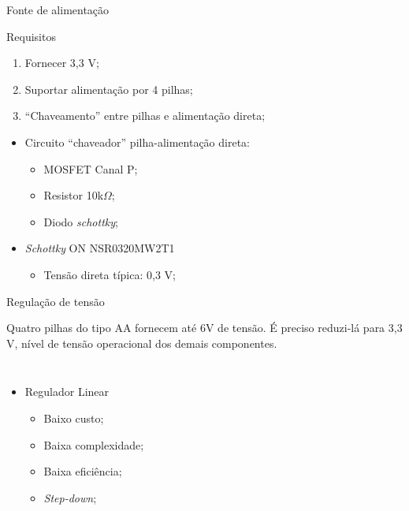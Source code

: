 \begin{frame}[allowframebreaks]{Fonte de alimentação}

\begin{block}{Requisitos}
    \begin{enumerate}
        \item Fornecer 3,3 V;
        \item Suportar alimentação por 4 pilhas;
        \item ``Chaveamento'' entre pilhas e alimentação direta;
    \end{enumerate}
\end{block}


\framebreak

\begin{itemize}
    \item Circuito ``chaveador'' pilha-alimentação direta:
        \begin{itemize}
            \item MOSFET Canal P;
            \item Resistor 10k$\Omega$;
            \item Diodo \textit{schottky};
        \end{itemize}
        \item \textit{Schottky} ON NSR0320MW2T1
        \begin{itemize}
            \item Tensão direta típica: 0,3 V;
        \end{itemize}
        
\end{itemize}



\framebreak
    
    
\begin{block}{Regulação de tensão}

Quatro pilhas do tipo AA fornecem até 6V de tensão. É preciso reduzi-lá para 3,3 V, nível de tensão operacional dos demais componentes.

\end{block}

\begin{columns}
        
        \centering
        \begin{itemize}
            \item Regulador Linear
            \begin{itemize}
                \item Baixo custo;
                \item Baixa complexidade;
                \item Baixa eficiência;
                \item \textit{Step-down};
            \end{itemize}
        \end{itemize}
        

\end{columns}
\end{frame}
